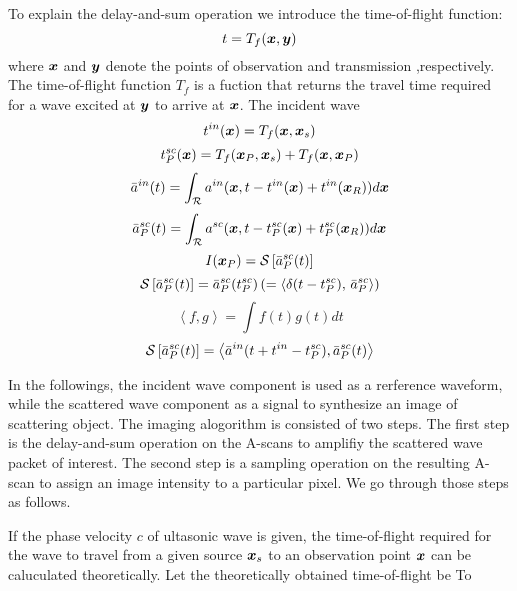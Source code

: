 ﻿\documentclass[11pt,a4j]{article}
\begin{document}
To explain the delay-and-sum operation we introduce the time-of-flight 
function:
\begin{equation}
	t=T_f(\mbox{\boldmath $x$},\mbox{\boldmath $y$})
	\label{eqn:Tf}
\end{equation}
where $\mbox{\boldmath $x$}$ and $\mbox{\boldmath $y$}$ denote the points of observation and transmission 
,respectively. 
The time-of-flight function $T_f$ is a fuction that returns the 
travel time required for a wave excited at $\mbox{\boldmath $y$}$ to arrive at $\mbox{\boldmath $x$}$.
The incident wave 
\begin{equation}
	t^{in}(\mbox{\boldmath $x$})=T_f(\mbox{\boldmath $x$},\mbox{\boldmath $x$}_s)
	\label{eqn:}
\end{equation}
\begin{equation}
	t_P^{sc}(\mbox{\boldmath $x$})=
	T_f(\mbox{\boldmath $x$}_P,\mbox{\boldmath $x$}_s)
	+
	T_f(\mbox{\boldmath $x$},\mbox{\boldmath $x$}_P)
	\label{eqn:}
\end{equation}
\begin{equation}
	\bar{a}^{in}(t)=\int _{\cal R} a^{in}(\mbox{\boldmath $x$},t-t^{in}(\mbox{\boldmath $x$})+t^{in}(\mbox{\boldmath $x$}_R))d\mbox{\boldmath $x$}
	\label{eqn:}
\end{equation}
\begin{equation}
	\bar{a}^{sc}_P(t)=\int _{\cal R} a^{sc}(\mbox{\boldmath $x$},t-t^{sc}_P(\mbox{\boldmath $x$})+t_P^{sc}(\mbox{\boldmath $x$}_R))d\mbox{\boldmath $x$}
	\label{eqn:}
\end{equation}
\begin{equation}
	I(\mbox{\boldmath $x$}_P)={\cal S} \left[ \bar{a}^{sc}_P(t) \right]
	\label{eqn:}
\end{equation}
\begin{equation}
	{\cal S} \left[ 
		\bar{a}^{sc}_P(t) 
		\right]
	=
	\bar{a}^{sc}_P(t^{sc}_P) 
	\left(
	=\left<
	\delta(t-t_P^{sc}),\,
	\bar{a}^{sc}_P
	\right>
	\right)
\end{equation}
\begin{equation}
	\left< f,g \right>=\int f(t)g(t) dt
	\label{eqn:}
\end{equation}
\begin{equation}
	{\cal S} \left[ 
		\bar{a}^{sc}_P(t) 
		\right]
	=
	\left< 
		\bar{a}^{in}(t+t^{in}-t^{sc}_P) 
		,\bar{a}^{sc}_P(t) 
	\right>
\end{equation}


In the followings, the incident wave component is used as a rerference waveform, 
while the scattered wave component as a signal to synthesize an image of 
scattering object.
The imaging alogorithm is consisted of two steps. The first step is 
the delay-and-sum operation on the A-scans to amplifiy the scattered wave packet of interest.
The second step is a sampling operation on the resulting A-scan to assign an image 
intensity to a particular pixel. We go through those steps as follows. 

If the phase velocity $c$ of ultasonic wave is given, the time-of-flight 
required for the wave to travel from a given source $\mbox{\boldmath $x$}_s$ to an observation point 
$\mbox{\boldmath $x$}$ can be caluculated theoretically. 
Let the theoretically obtained time-of-flight be
To 
\end{document}
